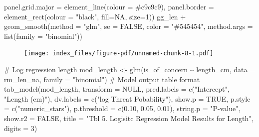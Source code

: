 \documentclass[
  letterpaper,
  DIV=11,
  numbers=noendperiod]{scrartcl}
\newenvironment{Shaded}{\begin{snugshade}}{\end{snugshade}}
\newcommand{\AttributeTok}[1]{\textcolor[rgb]{0.40,0.45,0.13}{#1}}
\newcommand{\CommentTok}[1]{\textcolor[rgb]{0.37,0.37,0.37}{#1}}
\newcommand{\ConstantTok}[1]{\textcolor[rgb]{0.56,0.35,0.01}{#1}}
\newcommand{\DecValTok}[1]{\textcolor[rgb]{0.68,0.00,0.00}{#1}}
\newcommand{\FloatTok}[1]{\textcolor[rgb]{0.68,0.00,0.00}{#1}}
\newcommand{\FunctionTok}[1]{\textcolor[rgb]{0.28,0.35,0.67}{#1}}
\newcommand{\NormalTok}[1]{\textcolor[rgb]{0.00,0.23,0.31}{#1}}
\newcommand{\OtherTok}[1]{\textcolor[rgb]{0.00,0.23,0.31}{#1}}
\newcommand{\SpecialCharTok}[1]{\textcolor[rgb]{0.37,0.37,0.37}{#1}}
\newcommand{\StringTok}[1]{\textcolor[rgb]{0.13,0.47,0.30}{#1}}
\begin{document}
\begin{Shaded}
\begin{Highlighting}[]
        \AttributeTok{panel.grid.major =} \FunctionTok{element\_line}\NormalTok{(}\AttributeTok{colour =} \StringTok{\textquotesingle{}\#c9c9c9\textquotesingle{}}\NormalTok{),}
        \AttributeTok{panel.border =} \FunctionTok{element\_rect}\NormalTok{(}\AttributeTok{colour =} \StringTok{"black"}\NormalTok{, }\AttributeTok{fill=}\ConstantTok{NA}\NormalTok{, }\AttributeTok{size=}\DecValTok{1}\NormalTok{))}
\NormalTok{gg\_len }\SpecialCharTok{+} \FunctionTok{geom\_smooth}\NormalTok{(}\AttributeTok{method =} \StringTok{"glm"}\NormalTok{, }
              \AttributeTok{se =} \ConstantTok{FALSE}\NormalTok{, }\AttributeTok{color =} \StringTok{"\#545454"}\NormalTok{, }
              \AttributeTok{method.args =} \FunctionTok{list}\NormalTok{(}\AttributeTok{family =} \StringTok{"binomial"}\NormalTok{))}
\end{Highlighting}
\end{Shaded}

\begin{figure}[H]

{\centering \texttt{[image: index\_files/figure-pdf/unnamed-chunk-8-1.pdf]}

}

\end{figure}

\begin{Shaded}
\begin{Highlighting}[]
\CommentTok{\# Log regression length}
\NormalTok{mod\_length }\OtherTok{\textless{}{-}} \FunctionTok{glm}\NormalTok{(is\_of\_concern }\SpecialCharTok{\textasciitilde{}}\NormalTok{ length\_cm, }
                  \AttributeTok{data =}\NormalTok{ rm\_len\_na, }
                  \AttributeTok{family =} \StringTok{"binomial"}\NormalTok{)}
\CommentTok{\# Model output table format}
\FunctionTok{tab\_model}\NormalTok{(mod\_length,}
          \AttributeTok{transform =} \ConstantTok{NULL}\NormalTok{,}
          \AttributeTok{pred.labels =} \FunctionTok{c}\NormalTok{(}\StringTok{"Intercept"}\NormalTok{, }\StringTok{"Length (cm)"}\NormalTok{),}
          \AttributeTok{dv.labels =} \FunctionTok{c}\NormalTok{(}\StringTok{"log Threat Pobability"}\NormalTok{),}
          \AttributeTok{show.p =} \ConstantTok{TRUE}\NormalTok{,}
          \AttributeTok{p.style =} \FunctionTok{c}\NormalTok{(}\StringTok{"numeric\_stars"}\NormalTok{),}
          \AttributeTok{p.threshold =} \FunctionTok{c}\NormalTok{(}\FloatTok{0.10}\NormalTok{, }\FloatTok{0.05}\NormalTok{, }\FloatTok{0.01}\NormalTok{),}
          \AttributeTok{string.p =} \StringTok{"P{-}value"}\NormalTok{,}
          \AttributeTok{show.r2 =} \ConstantTok{FALSE}\NormalTok{,}
          \AttributeTok{title =} \StringTok{"Tbl 5. Logisitc Regression Model Results for Length"}\NormalTok{,}
          \AttributeTok{digits =} \DecValTok{3}\NormalTok{)}
\end{Highlighting}
\end{Shaded}
\end{document}
